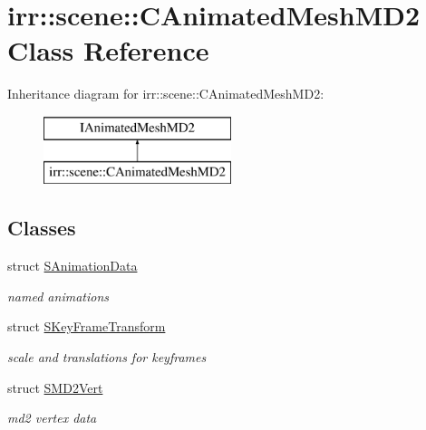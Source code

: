 \hypertarget{classirr_1_1scene_1_1_c_animated_mesh_m_d2}{\section{irr\-:\-:scene\-:\-:C\-Animated\-Mesh\-M\-D2 Class Reference}
\label{classirr_1_1scene_1_1_c_animated_mesh_m_d2}
}
Inheritance diagram for irr\-:\-:scene\-:\-:C\-Animated\-Mesh\-M\-D2\-:\begin{figure}[H]
\begin{center}
\leavevmode
\includegraphics[height=2.000000cm]{classirr_1_1scene_1_1_c_animated_mesh_m_d2}
\end{center}
\end{figure}
\subsection*{Classes}
\begin{DoxyCompactItemize}
\item 
struct \hyperlink{structirr_1_1scene_1_1_c_animated_mesh_m_d2_1_1_s_animation_data}{S\-Animation\-Data}
\begin{DoxyCompactList}\small\item\em named animations \end{DoxyCompactList}\item 
struct \hyperlink{structirr_1_1scene_1_1_c_animated_mesh_m_d2_1_1_s_key_frame_transform}{S\-Key\-Frame\-Transform}
\begin{DoxyCompactList}\small\item\em scale and translations for keyframes \end{DoxyCompactList}\item 
struct \hyperlink{structirr_1_1scene_1_1_c_animated_mesh_m_d2_1_1_s_m_d2_vert}{S\-M\-D2\-Vert}
\begin{DoxyCompactList}\small\item\em md2 vertex data \end{DoxyCompactList}\end{DoxyCompactItemize}

